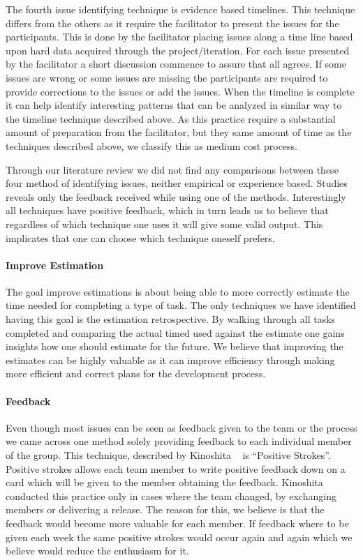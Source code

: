\documentclass[12pt]{article}
\begin{document}
The fourth issue identifying technique is evidence based timelines. This technique differs from the others as it require the facilitator to present the issues for the participants. This is done by the facilitator placing issues along a time line based upon hard data acquired through the project/iteration. For each issue presented by the facilitator a short discussion commence to assure that all agrees. If some issues are wrong or some issues are missing the participants are required to provide corrections to the issues or add the issues. When the timeline is complete it can help identify interesting patterns that can be analyzed in similar way to the timeline technique described above. As this practice require a substantial amount of preparation from the facilitator, but they same amount of time as the techniques described above, we classify this as medium cost process.

Through our literature review we did not find any comparisons between these four method of identifying issues, neither empirical or experience based. Studies reveals only the feedback received while using one of the methods. Interestingly all techniques have positive feedback, which in turn leads us to believe that regardless of which technique one uses it will give some valid output. This implicates that one can choose which technique oneself prefers.

\paragraph{Improve Estimation}
The goal improve estimations is about being able to more correctly estimate the time needed for completing a type of task. The only techniques we have identified having this goal is the estimation retrospective. By walking through all tasks completed and comparing the actual timed used against the estimate one gains insights how one should estimate for the future. We believe that improving the estimates can be highly valuable as it can improve efficiency through making more efficient and correct plans for the development process. 

\paragraph{Feedback}
Even though most issues can be seen as feedback given to the team or the process we came across one method solely providing feedback to each individual member of the group. This technique, described by Kinoshita ~\cite{Kinoshita2008} is ``Positive Strokes''. Positive strokes allows each team member to write positive feedback down on a card which will be given to the member obtaining the feedback. Kinoshita conducted this practice only in cases where the team changed, by exchanging members or delivering a release. The reason for this, we believe is that the feedback would become more valuable for each member. If feedback where to be given each week the same positive strokes would occur again and again which we believe would reduce the enthusiasm for it. 
\end{document}
